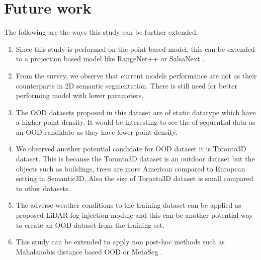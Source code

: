     \section{Future work}
    The following are the ways this study can be further extended.
    \begin{enumerate}
        \item Since this study is performed on the point based model, this can be extended to a projection based model like RangeNet++ \cite{Hu_2020_CVPR_Randla} or SalsaNext \cite{SalsaNext_2020}.
        \item From the survey, we observe that current models performance are not as their counterparts in 2D semantic segmentation. There is still need for better performing model with lower parameters.
        \item The OOD datasets proposed in this dataset are of static datatype which have a higher point density. It would be interesting to see the of sequential data as an OOD candidate as they have lower point density.
        \item We observed another potential candidate for OOD dataset it is Toronto3D dataset. This is because the Toronto3D dataset is an outdoor dataset but the objects such as buildings, trees are more American compared to European setting in Semantic3D. Also the size of Toronto3D dataset is small compared to other datasets.
        \item The adverse weather conditions to the training dataset can be applied as \cite{fogsim} proposed LiDAR fog injection module and this can be another potential way to create an OOD dataset from the training set.
        \item This study can be extended to apply non post-hoc methods such as Mahalanobis distance based OOD \cite{lee2018simple_mahalanobis} or MetaSeg \cite{MetaSeg}.
    \end{enumerate}

